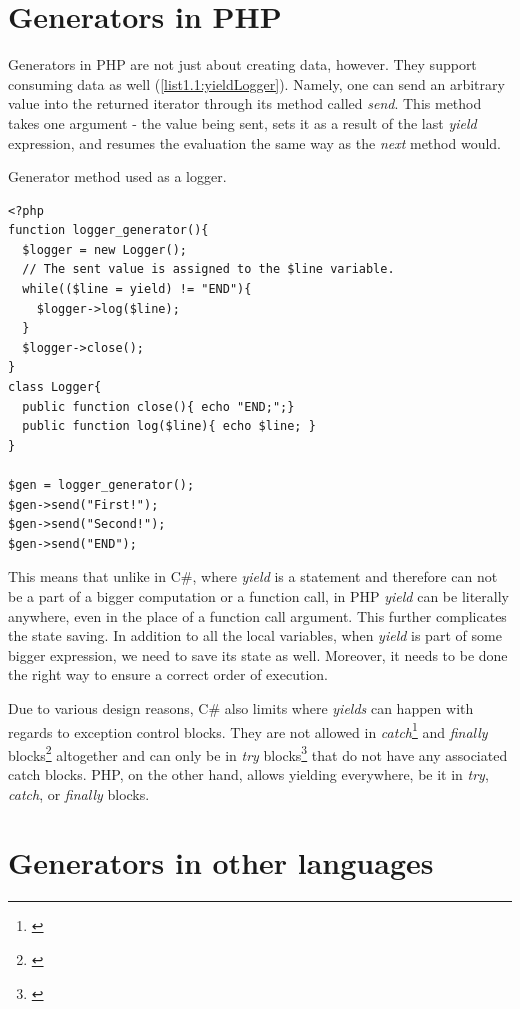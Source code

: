\section{Generators in PHP}

Generators in PHP are not just about creating data, however. They support consuming data as well (\autoref{list1.1:yieldLogger}). Namely, one can send an arbitrary value into the returned iterator through its method called \emph{send}. This method takes one argument - the value being sent, sets it as a result of the last \emph{yield} expression, and resumes the evaluation the same way as the \emph{next} method would.

\begin{listing}[H]
	\caption{Generator method used as a logger.}
	\label{list1.1:yieldLogger}
\begin{verbatim}
<?php
function logger_generator(){
  $logger = new Logger();
  // The sent value is assigned to the $line variable.
  while(($line = yield) != "END"){
    $logger->log($line);
  }
  $logger->close();
}
class Logger{
  public function close(){ echo "END;";}
  public function log($line){ echo $line; }
}

$gen = logger_generator();
$gen->send("First!");
$gen->send("Second!");
$gen->send("END");
\end{verbatim}
\end{listing}

This means that unlike in C\#, where \emph{yield} is a statement and therefore can not be a part of a bigger computation or a function call, in PHP \emph{yield} can be literally anywhere, even in the place of a function call argument. This further complicates the state saving. In addition to all the local variables, when \emph{yield} is part of some bigger expression, we need to save its state as well. Moreover, it needs to be done the right way to ensure a correct order of execution.

Due to various design reasons, \citep{CSharpYieldFinaly} C\# also limits where \emph{yields} can happen with regards to exception control blocks. They are not allowed in \emph{catch}\footnote{\citep{CSharpYieldCatch}} and \emph{finally} blocks\footnote{\citep{CSharpYieldFinaly}} altogether and can only be in \emph{try} blocks\footnote{\citep{CSharpYieldTry}} that do not have any associated catch blocks. PHP, on the other hand, allows yielding everywhere, be it in \emph{try}, \emph{catch}, or \emph{finally} blocks.

\section{Generators in other languages}

